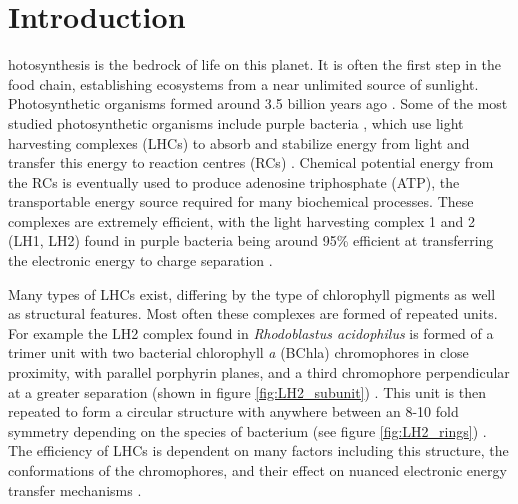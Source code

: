 %
%
\chapter{Introduction}
\label{chap:intro}

hotosynthesis is the bedrock of life on this planet. It is often the 
first step in the food chain, establishing ecosystems from a near unlimited source 
of sunlight. Photosynthetic organisms formed around 3.5 billion years ago \cite{Blankenship2010}.
Some of the most studied photosynthetic organisms include purple bacteria \cite{Cogdell2021, Mirkovic2016, Cleary2013, Curutchet2016, Sundstro1999, Damjanovic2002, Konig2012}, 
which use light harvesting complexes (LHCs) to absorb and stabilize energy from 
light and transfer this energy to reaction centres (RCs) \cite{Klamt2008}. Chemical
potential energy from the RCs is eventually used to produce adenosine triphosphate (ATP),
the transportable energy source required for many biochemical processes. These complexes
are extremely efficient, with the light harvesting complex 1 and 2 (LH1, LH2) found 
in purple bacteria being around 95\% efficient at transferring the electronic energy 
to charge separation \cite{Tretiak2000}.

Many types of LHCs exist, differing by the type of chlorophyll pigments as well 
as structural features. Most often these complexes are formed of repeated units.
For example the LH2 complex found in \emph{Rhodoblastus acidophilus} is formed of 
a trimer unit with two bacterial chlorophyll \emph{a} (BChla) chromophores in close 
proximity, with parallel porphyrin planes, and a third chromophore perpendicular 
at a greater separation (shown in figure \ref{fig:LH2_subunit}) \cite{Cogdell2006}. 
This unit is then repeated to form a circular structure with anywhere between an
8-10 fold symmetry depending on the species of bacterium (see figure \ref{fig:LH2_rings})
\cite{Mallus2018, Cleary2013}. The efficiency of LHCs is dependent on many factors 
including this structure, the conformations of the chromophores, and their effect 
on nuanced electronic energy transfer mechanisms \cite{Harel2012}.

